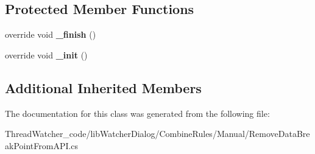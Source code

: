 \subsection*{Protected Member Functions}
\begin{DoxyCompactItemize}
\item 
\hypertarget{classlib_watcher_dialog_1_1_combine_rules_1_1_remove_data_break_point_from_a_p_i_abe88285fb94917b1975a511043fc0f32}{override void {\bfseries \+\_\+finish} ()}\label{classlib_watcher_dialog_1_1_combine_rules_1_1_remove_data_break_point_from_a_p_i_abe88285fb94917b1975a511043fc0f32}

\item 
\hypertarget{classlib_watcher_dialog_1_1_combine_rules_1_1_remove_data_break_point_from_a_p_i_a2f861a6b9263095b55783b00ead4969f}{override void {\bfseries \+\_\+init} ()}\label{classlib_watcher_dialog_1_1_combine_rules_1_1_remove_data_break_point_from_a_p_i_a2f861a6b9263095b55783b00ead4969f}

\end{DoxyCompactItemize}
\subsection*{Additional Inherited Members}


The documentation for this class was generated from the following file\+:\begin{DoxyCompactItemize}
\item 
Thread\+Watcher\+\_\+code/lib\+Watcher\+Dialog/\+Combine\+Rules/\+Manual/Remove\+Data\+Break\+Point\+From\+A\+P\+I.\+cs\end{DoxyCompactItemize}
